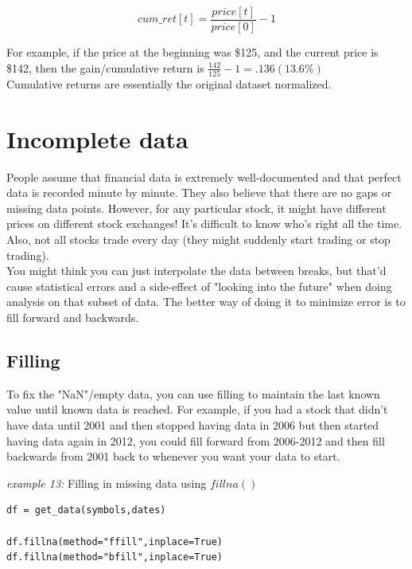 \begin{equation*}
	cum\_ret[t] = \frac{price[t]}{price[0]}-1
\end{equation*}

\noindent For example, if the price at the beginning was \$125, and the current price is \$142, then the gain/cumulative return is $\frac{142}{125}-1 = .136 (13.6\%)$\\

\noindent Cumulative returns are essentially the original dataset normalized.

\section{Incomplete data}
\noindent People assume that financial data is extremely well-documented and that perfect data is recorded minute by minute. They also believe that there are no gaps or missing data points. However, for any particular stock, it might have different prices on different stock exchanges! It's difficult to know who's right all the time. Also, not all stocks trade every day (they might suddenly start trading or stop trading).\\

\noindent You might think you can just interpolate the data between breaks, but that'd cause statistical errors and a side-effect of "looking into the future" when doing analysis on that subset of data. The better way of doing it to minimize error is to fill forward and backwards.

\subsection{Filling}
\noindent To fix the "NaN"/empty data, you can use filling to maintain the last known value until known data is reached. For example, if you had a stock that didn't have data until 2001 and then stopped having data in 2006 but then started having data again in 2012, you could fill forward from 2006-2012 and then fill backwards from 2001 back to whenever you want your data to start.\\

\noindent\begin{minipage}{\linewidth}

\noindent\textit{example 13:} Filling in missing data using $fillna()$
\begin{lstlisting}[style=python]
df = get_data(symbols,dates)

df.fillna(method="ffill",inplace=True)
df.fillna(method="bfill",inplace=True)
\end{lstlisting}
\end{minipage}

